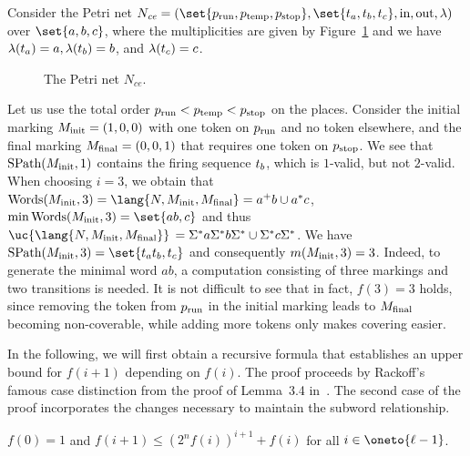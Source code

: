 \documentclass[../../diss.tex]{subfiles}
\begin{document}
\begin{example}%
\label{Example:Rackoff}%
    Consider the Petri net $N_{\mathit{ce}} = (\set{ \rprun, \rptemp, \rpstop  }, \set{ \rthelp, \rtb, \rta  }, \i, \o, \lambda)$ over $\set{a,b,c}$, where the multiplicities are given by Figure~\ref{Figure:Rackoff} and we have $\lambda(t_a) = a, \lambda(t_b) = b$, and $\lambda (t_c) = c$.
    \begin{figure}
        \centering%
        \caption{The Petri net $N_{\mathit{ce}}$.}%
        \label{Figure:Rackoff}%
    \end{figure}
    Let us use the total order $p_\text{run} < p_\text{temp} < p_\text{stop}$ on the places.
    Consider the initial marking $M_{\text{init}} = (1,0,0)$ with one token on $p_\text{run}$ and no token elsewhere, and the final marking $M_{\text{final}} = (0,0,1)$ that requires one token on $p_\text{stop}$.
    We see that $\text{SPath}(M_{\text{init}},1)$ contains the firing sequence $t_b$, which is $1$-valid, but not $2$-valid.
    When choosing $i = 3$, we obtain that $\Words(\Minit,3) = \lang{N,\Minit,\Mfinal} = a^+b \cup a^*c$, $\min \Words(\Minit,3) = \set{ab, c}$ and thus $\uc{\lang{N,\Minit,\Mfinal}} \, =  \Sigma^*a\Sigma^*b\Sigma^* \cup \Sigma^*c\Sigma^*$.
    We have $\SPath(\Minit,3) = \set{ \rthelp \rtb, \rta}$ and consequently $m(M_{\text{init}},3) = 3$.
    Indeed, to generate the minimal word $ab$, a computation consisting of three markings and two transitions is needed.
    It is not difficult to see that in fact, $f(3) = 3$ holds, since removing the token from $p_\text{run}$ in the initial marking leads to $M_{\text{final}}$ becoming non-coverable, while adding more tokens only makes covering easier.
\end{example}


In the following, we will first obtain a recursive formula that establishes an upper bound for $f(i+1)$ depending on $f(i)$.
The proof proceeds by Rackoff's famous case distinction from the proof of Lemma~3.4 in~\cite{Rackoff78}.
The second case of the proof incorporates the changes necessary to maintain the subword relationship.

\begin{proposition}%
\label{Proposition:PNRackoffRecursiveBound}%
    $f(0) = 1$ and $f(i+1) \leq {(2^n f(i))}^{i+1} + f(i)$ for all $i\in \oneto{\ell-1}$.
\end{proposition}
\end{document}

